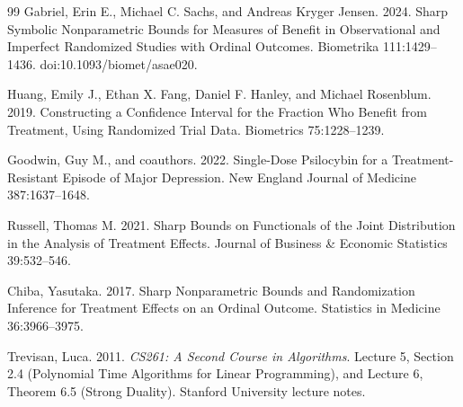\documentclass{article}
\begin{document}
\begin{thebibliography}{99}
   Gabriel, Erin E., Michael C. Sachs, and Andreas Kryger Jensen. 2024. Sharp Symbolic Nonparametric Bounds for Measures of Benefit in Observational and Imperfect Randomized Studies with Ordinal Outcomes. Biometrika 111:1429--1436. doi:10.1093/biomet/asae020.

   Huang, Emily J., Ethan X. Fang, Daniel F. Hanley, and Michael Rosenblum. 2019. Constructing a Confidence Interval for the Fraction Who Benefit from Treatment, Using Randomized Trial Data. Biometrics 75:1228--1239.

   Goodwin, Guy M., and coauthors. 2022. Single-Dose Psilocybin for a Treatment-Resistant Episode of Major Depression. New England Journal of Medicine 387:1637--1648.

   Russell, Thomas M. 2021. Sharp Bounds on Functionals of the Joint Distribution in the Analysis of Treatment Effects. Journal of Business \& Economic Statistics 39:532--546.

   Chiba, Yasutaka. 2017. Sharp Nonparametric Bounds and Randomization Inference for Treatment Effects on an Ordinal Outcome. Statistics in Medicine 36:3966--3975.

   Trevisan, Luca. 2011. \emph{CS261: A Second Course in Algorithms}. Lecture 5, Section 2.4 (Polynomial Time Algorithms for Linear Programming), and Lecture 6, Theorem 6.5 (Strong Duality). Stanford University lecture notes.

\end{thebibliography}
\end{document}
